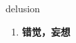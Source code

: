 
\begin{frame}
{\huge delusion}
\begin{center}
\begin{enumerate}\Large
  \item \textbf{错觉，妄想}
\end{enumerate}
\end{center}
\end{frame}
